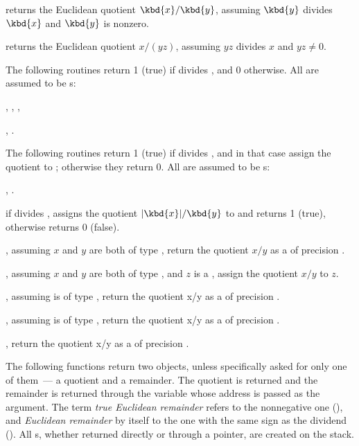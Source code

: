  returns the Euclidean quotient
$\kbd{x} / \kbd{y}$, assuming $\kbd{y}$ divides
$\kbd{x}$ and $\kbd{y}$ is nonzero.

 returns the Euclidean
quotient $x/(yz)$, assuming $yz$ divides $x$ and $yz \neq 0$.

The following routines return 1 (true) if  divides , and
0 otherwise. All  are assumed to be s:

,
,
,

,
.

The following routines return 1 (true) if  divides , and in
that case assign the quotient to ; otherwise they return 0. All
 are assumed to be s:

,
.

 if  divides , assigns
the quotient $|\kbd{x}|/\kbd{y}$ to  and returns 1 (true), otherwise
returns 0 (false).


, assuming $x$ and $y$
are both of type , return the quotient $x/y$ as a  of
precision .

, assuming $x$ and $y$
are both of type , and $z$ is a ,
assign the quotient $x/y$ to $z$.

, assuming 
is of type , return the quotient x/y as a  of
precision .

, assuming 
is of type , return the quotient x/y as a  of
precision .

, return the quotient x/y as a
 of precision .


 The following functions return two objects,
unless specifically asked for only one of them~--- a quotient and a remainder.
The quotient is returned and the remainder is returned through the variable
whose address is passed as the  argument. The term \emph{true
Euclidean remainder} refers to the nonnegative one (), and
\emph{Euclidean remainder} by itself to the one with the same sign as the
dividend (). All s, whether returned directly or through a
pointer, are created on the stack.

